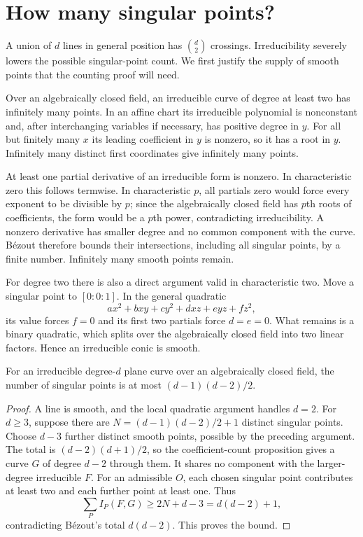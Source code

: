 \section{How many singular points?}

A union of $d$ lines in general position has $\binom d2$ crossings. Irreducibility severely lowers the possible singular-point count. We first justify the supply of smooth points that the counting proof will need.

Over an algebraically closed field, an irreducible curve of degree at least two has infinitely many points. In an affine chart its irreducible polynomial is nonconstant and, after interchanging variables if necessary, has positive degree in $y$. For all but finitely many $x$ its leading coefficient in $y$ is nonzero, so it has a root in $y$. Infinitely many distinct first coordinates give infinitely many points.

At least one partial derivative of an irreducible form is nonzero. In characteristic zero this follows termwise. In characteristic $p$, all partials zero would force every exponent to be divisible by $p$; since the algebraically closed field has $p$th roots of coefficients, the form would be a $p$th power, contradicting irreducibility. A nonzero derivative has smaller degree and no common component with the curve. B\'ezout therefore bounds their intersections, including all singular points, by a finite number. Infinitely many smooth points remain.

For degree two there is also a direct argument valid in characteristic two. Move a singular point to $[0:0:1]$. In the general quadratic
\[
ax^2+bxy+cy^2+dxz+eyz+fz^2,
\]
its value forces $f=0$ and its first two partials force $d=e=0$. What remains is a binary quadratic, which splits over the algebraically closed field into two linear factors. Hence an irreducible conic is smooth.

\begin{theorem}\label{geometry:thm:singbound}
For an irreducible degree-$d$ plane curve over an algebraically closed field, the number of singular points is at most $(d-1)(d-2)/2$.
\end{theorem}
\begin{proof}
A line is smooth, and the local quadratic argument handles $d=2$. For $d\ge3$, suppose there are
$N=(d-1)(d-2)/2+1$ distinct singular points. Choose $d-3$ further distinct smooth points, possible by the preceding argument. The total is $(d-2)(d+1)/2$, so the coefficient-count proposition gives a curve $G$ of degree $d-2$ through them. It shares no component with the larger-degree irreducible $F$. For an admissible $O$, each chosen singular point contributes at least two and each further point at least one. Thus
\[
\sum_PI_P(F,G)\ge2N+d-3=d(d-2)+1,
\]
contradicting B\'ezout's total $d(d-2)$. This proves the bound.
\end{proof}

